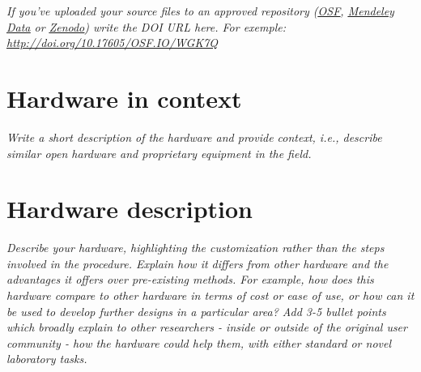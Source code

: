 \documentclass[11pt, letterpaper]{article}
\begin{document}
\begin{flushleft}
\begin{tabu}
  \textit{If you’ve uploaded your source files to an approved repository (\href{http://osf.io}{\underline{OSF}}, \href{https://data.mendeley.com/}{\underline{Mendeley Data}} or \href{https://zenodo.org/}{\underline{Zenodo}}) write the DOI URL here. For exemple:  \href{http://doi.org/10.17605/OSF.IO/WGK7Q}{http://doi.org/10.17605/OSF.IO/WGK7Q}}  
  \\
\hline
\end{tabu}
\end{flushleft}
\newpage
\section{Hardware in context}
\textit{Write a short description of the hardware and provide context, i.e., describe similar open hardware and proprietary equipment in the field.}

\section{Hardware description}


\textit{Describe your hardware, highlighting the customization rather than the steps involved in the procedure. Explain how it differs from other hardware and the advantages it offers over pre-existing methods. For example, how does this hardware compare to other hardware in terms of cost or ease of use, or how can it be used to develop further designs in a particular area? 
\vskip 0.3cm \noindent
Add 3-5 bullet points which broadly explain to other researchers - inside or outside of the original user community - how the hardware could help them, with either standard or novel laboratory tasks.}
\end{document}
